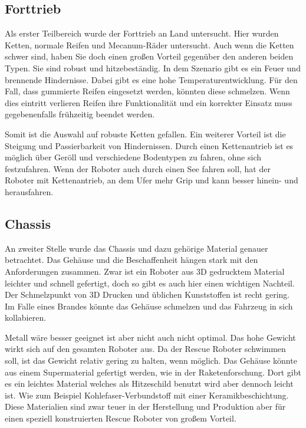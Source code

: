 \subsection {Forttrieb}
Als erster Teilbereich wurde der Forttrieb an Land untersucht. 
Hier wurden Ketten, normale Reifen und Mecanum-Räder untersucht. 
Auch wenn die Ketten schwer sind, haben Sie doch einen großen Vorteil gegenüber den anderen beiden Typen. 
Sie sind robust und hitzebeständig. In dem Szenario gibt es ein Feuer und brennende Hindernisse.
Dabei gibt es eine hohe Temperaturentwicklung. 
Für den Fall, dass gummierte Reifen eingesetzt werden, könnten diese schmelzen.
Wenn dies eintritt verlieren Reifen ihre Funktionalität und ein korrekter Einsatz muss gegebenenfalls frühzeitig beendet werden. 

Somit ist die Auswahl auf robuste Ketten gefallen.
Ein weiterer Vorteil ist die Steigung und Passierbarkeit von Hindernissen. 
Durch einen Kettenantrieb ist es möglich über Geröll und verschiedene Bodentypen zu fahren, ohne sich festzufahren.
Wenn der Roboter auch durch einen See fahren soll, hat der Roboter mit Kettenantrieb, an dem Ufer mehr Grip und kann besser hinein- und herausfahren. 

\subsection {Chassis}
An zweiter Stelle wurde das  Chassis und dazu gehörige Material genauer betrachtet. 
Das Gehäuse und die Beschaffenheit hängen stark mit den Anforderungen zusammen. 
Zwar ist ein Roboter aus 3D gedrucktem Material leichter und schnell gefertigt, doch so gibt es auch hier einen wichtigen Nachteil. 
Der Schmelzpunkt von 3D Drucken und üblichen Kunststoffen ist recht gering.
Im Falle eines Brandes könnte das Gehäuse schmelzen und das Fahrzeug in sich kollabieren.

Metall wäre besser geeignet ist aber nicht auch nicht optimal. 
Das hohe Gewicht wirkt sich auf den gesamten Roboter aus. 
Da der Rescue Roboter schwimmen soll, ist das Gewicht relativ gering zu halten, wenn möglich.
Das Gehäuse könnte aus einem Supermaterial gefertigt werden, wie in der Raketenforschung. 
Dort gibt es ein leichtes Material welches als Hitzeschild benutzt wird aber dennoch leicht ist. 
Wie zum Beispiel Kohlefaser-Verbundstoff mit einer Keramikbeschichtung. 
Diese Materialien sind zwar teuer in der Herstellung und Produktion aber für einen speziell konstruierten Rescue Roboter von großem Vorteil. 

